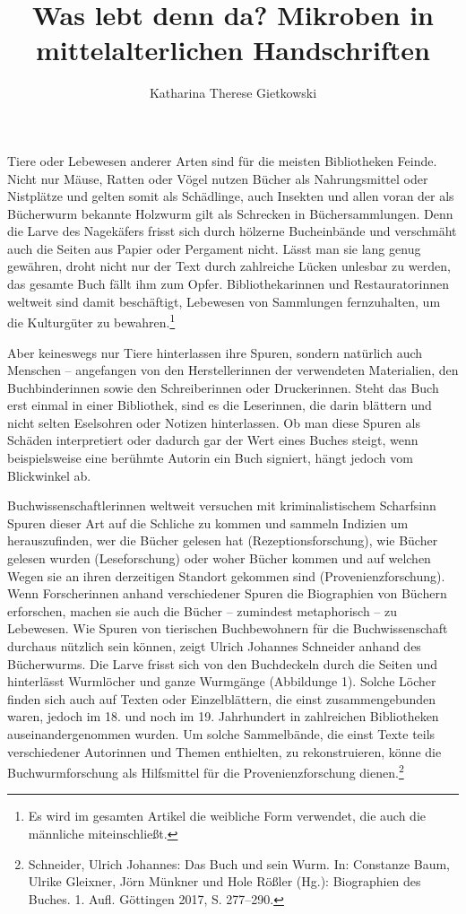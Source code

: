 \documentclass[a4paper,
fontsize=11pt,
oneside,
numbers=noperiodatend,
parskip=half-,
bibliography=totoc,
final
]{scrartcl}
\title{\LARGE{Was lebt denn da? Mikroben in mittelalterlichen Handschriften}}%
\author{Katharina Therese Gietkowski} %
\date{}
\begin{document}
\maketitle
\thispagestyle{fancyplain} 


Tiere oder Lebewesen anderer Arten sind für die meisten Bibliotheken
Feinde. Nicht nur Mäuse, Ratten oder Vögel nutzen Bücher als
Nahrungsmittel oder Nistplätze und gelten somit als Schädlinge, auch
Insekten und allen voran der als Bücherwurm bekannte Holzwurm gilt als
Schrecken in Büchersammlungen. Denn die Larve des Nagekäfers frisst sich
durch hölzerne Bucheinbände und verschmäht auch die Seiten aus Papier
oder Pergament nicht. Lässt man sie lang genug gewähren, droht nicht nur
der Text durch zahlreiche Lücken unlesbar zu werden, das gesamte Buch
fällt ihm zum Opfer. Bibliothekarinnen und Restauratorinnen weltweit
sind damit beschäftigt, Lebewesen von Sammlungen fernzuhalten, um die
Kulturgüter zu bewahren.\footnote{Es wird im gesamten Artikel die
  weibliche Form verwendet, die auch die männliche miteinschließt.}

Aber keineswegs nur Tiere hinterlassen ihre Spuren, sondern natürlich
auch Menschen -- angefangen von den Herstellerinnen der verwendeten
Materialien, den Buchbinderinnen sowie den Schreiberinnen oder
Druckerinnen. Steht das Buch erst einmal in einer Bibliothek, sind es
die Leserinnen, die darin blättern und nicht selten Eselsohren oder
Notizen hinterlassen. Ob man diese Spuren als Schäden interpretiert oder
dadurch gar der Wert eines Buches steigt, wenn beispielsweise eine
berühmte Autorin ein Buch signiert, hängt jedoch vom Blickwinkel ab.

Buchwissenschaftlerinnen weltweit versuchen mit kriminalistischem
Scharfsinn Spuren dieser Art auf die Schliche zu kommen und sammeln
Indizien um herauszufinden, wer die Bücher gelesen hat
(Rezeptionsforschung), wie Bücher gelesen wurden (Leseforschung) oder
woher Bücher kommen und auf welchen Wegen sie an ihren derzeitigen
Standort gekommen sind (Provenienzforschung). Wenn Forscherinnen anhand
verschiedener Spuren die Biographien von Büchern erforschen, machen sie
auch die Bücher -- zumindest metaphorisch -- zu Lebewesen. Wie Spuren
von tierischen Buchbewohnern für die Buchwissenschaft durchaus nützlich
sein können, zeigt Ulrich Johannes Schneider anhand des Bücherwurms. Die
Larve frisst sich von den Buchdeckeln durch die Seiten und hinterlässt
Wurmlöcher und ganze Wurmgänge (Abbildunge 1). Solche Löcher
finden sich auch auf Texten oder Einzelblättern, die einst
zusammengebunden waren, jedoch im 18. und noch im 19. Jahrhundert in
zahlreichen Bibliotheken auseinandergenommen wurden. Um solche
Sammelbände, die einst Texte teils verschiedener Autorinnen und Themen
enthielten, zu rekonstruieren, könne die Buchwurmforschung als
Hilfsmittel für die Provenienzforschung dienen.\footnote{Schneider,
  Ulrich Johannes: Das Buch und sein Wurm. In: Constanze Baum, Ulrike
  Gleixner, Jörn Münkner und Hole Rößler (Hg.): Biographien des Buches.
  1. Aufl. Göttingen 2017, S. 277--290.}
\end{document}
